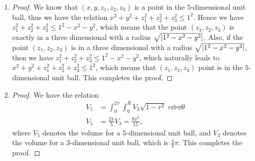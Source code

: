 \documentclass[8pt,twocolumn]{article}
\begin{document}
\begin{Answer}[number=34]
  \begin{enumerate}
    \item
      \begin{proof}
        We know that $(x,y,z_1,z_2,z_3)$ is a point in the $5$-dimensional unit
        ball, thus we have the relation $x^2+y^2+z_1^2+z_2^2+z_3^2 \le 1^2$.
        Hence we have $z_1^2+z_2^2+z_3^2 \le 1^2-x^2-y^2$, which means that the
        point $(z_1, z_2, z_3)$ is exactly in a three dimensional with a radius
        $\sqrt{\abs{1^2-x^2-y^2}}$. Also, if the point $(z_1, z_2, z_3)$ is in
        a three dimensional with a radius $\sqrt{\abs{1^2-x^2-y^2}}$, then we
        have $z_1^2+z_2^2+z_3^2 \le 1^2-x^2-y^2$, which naturally leads to
        $x^2+y^2+z_1^2+z_2^2+z_3^2 \le 1^2$, which means that $(z_1, z_2, z_3)$
        point is in the $5$-dimensional unit ball. This completes the proof.
      \end{proof}
    \item
      \begin{proof}
        We have the relation
        \begin{align*}
          V_5&=\int_0^{2\pi} \int_0^R V_{3} \sqrt{1-r^2}\; r \dd{r}\dd{\theta}\\
          V_5&=\frac{2\pi}{5} V_3 = \frac{8\pi^2}{15},
        \end{align*}
        where $V_5$ denotes the volume for a $5$-dimensional unit ball, and
        $V_3$ denotes the volume for a $3$-dimensional unit ball, which is
        $\frac{4}{3}\pi$.
        This completes the proof.
      \end{proof}
  \end{enumerate}
\end{Answer}
\end{document}
